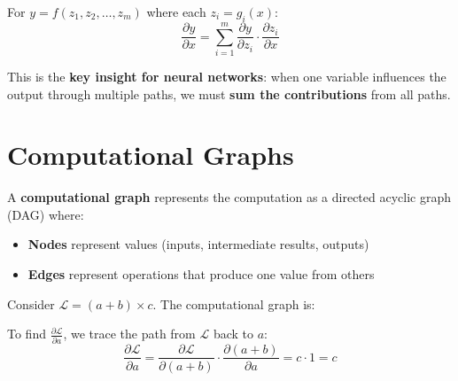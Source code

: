 For $y = f(z_1, z_2, \ldots, z_m)$ where each $z_i = g_i(x)$:
\[
\frac{\partial y}{\partial x} = \sum_{i=1}^{m} \frac{\partial y}{\partial z_i} \cdot \frac{\partial z_i}{\partial x}
\]

\begin{important}
This is the \textbf{key insight for neural networks}: when one variable influences the output through multiple paths, we must \textbf{sum the contributions} from all paths.
\end{important}

\section{Computational Graphs}

A \textbf{computational graph} represents the computation as a directed acyclic graph (DAG) where:
\begin{itemize}
    \item \textbf{Nodes} represent values (inputs, intermediate results, outputs)
    \item \textbf{Edges} represent operations that produce one value from others
\end{itemize}

\begin{example}
Consider $\mathcal{L} = (a + b) \times c$. The computational graph is:

\begin{center}
\end{center}

To find $\frac{\partial \mathcal{L}}{\partial a}$, we trace the path from $\mathcal{L}$ back to $a$:
\[
\frac{\partial \mathcal{L}}{\partial a} = \frac{\partial \mathcal{L}}{\partial (a+b)} \cdot \frac{\partial (a+b)}{\partial a} = c \cdot 1 = c
\]
\end{example}

